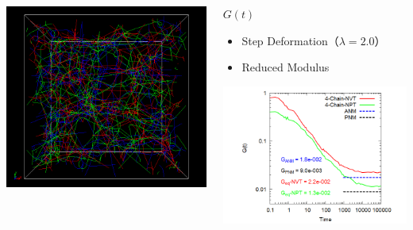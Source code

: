 \documentclass[12pt, dvipdfmx]{beamer}
\begin{document}
\begin{frame}
\begin{columns}[T, onlytextwidth]
\begin{itemize}
					\includegraphics[width=.62\textwidth]{N48_f4_PPA.png}
				\end{itemize}
			\begin{block}{$G(t)$}
				\begin{itemize}
					\item Step Deformation（$\lambda=2.0$）
					\item Reduced Modulus
				\end{itemize}
					\includegraphics[width=\textwidth]{gt_4chain_comp.png}
				\end{block}
		\end{columns}
\end{frame}
\end{document}
